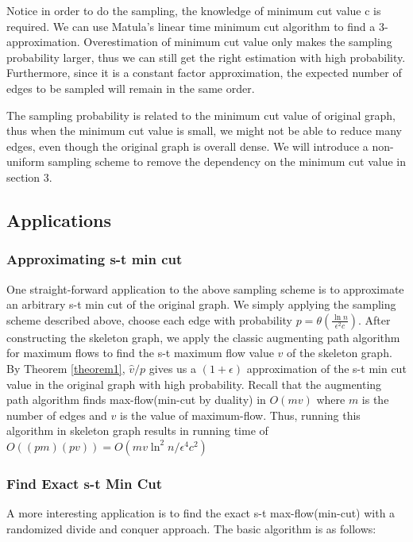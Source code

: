 \documentclass{article}
\begin{document}
Notice in order to do the sampling, the knowledge of minimum cut value c is required. We can use Matula's linear time minimum cut algorithm to find a 3-approximation. Overestimation of minimum cut value only makes the sampling probability larger, thus we can still get the right estimation with high probability. Furthermore, since it is a constant factor approximation, the expected number of edges to be sampled will remain in the same order.
\bigskip

The sampling probability is related to the minimum cut value of original graph, thus when the minimum cut value is small, we might not be able to reduce many edges, even though the original graph is overall dense. We will introduce a non-uniform sampling scheme to remove the dependency on the minimum cut value in section 3.

\subsection{Applications}

\subsubsection{Approximating s-t min cut\citep{karger1999random} }
One straight-forward application to the above sampling scheme is to approximate an arbitrary s-t min cut of the original graph. 
We simply applying the sampling scheme described above, choose each edge with probability $p = \theta (\frac{\ln{n}}{\epsilon^2c})$.
After constructing the skeleton graph, we apply the classic augmenting path algorithm for maximum flows to find the s-t maximum flow value $\hat{v}$ of the skeleton graph.
By Theorem \ref{theorem1}, $\hat{v}/p$ gives us a $(1 + \epsilon)$ approximation of the s-t min cut value in the original graph with high probability.
Recall that the augmenting path algorithm finds max-flow(min-cut by duality) in $O(mv)$ where $m$ is the number of edges and $v$ is the value of maximum-flow.
Thus, running this algorithm in skeleton graph results in running time of $O((pm)(pv)) = O(mv\ln^2{n}/\epsilon^4c^2)$

\subsubsection{Find Exact s-t Min Cut\citep{karger1999random}}
A more interesting application is to find the exact s-t max-flow(min-cut) with a randomized divide and conquer approach. The basic algorithm is as follows:
\end{document}
